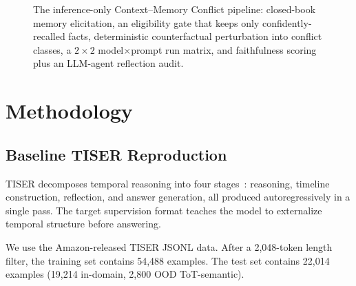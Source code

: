 \documentclass[conference]{IEEEtran}
\begin{document}
\begin{figure}[t]
\centering
{}
\caption{The inference-only Context--Memory Conflict pipeline: closed-book memory elicitation, an eligibility gate that keeps only confidently-recalled facts, deterministic counterfactual perturbation into conflict classes, a $2{\times}2$ model$\times$prompt run matrix, and faithfulness scoring plus an LLM-agent reflection audit.}
\label{fig:pipeline}
\end{figure}

\section{Methodology}
\label{sec:methodology}

\subsection{Baseline TISER Reproduction}

TISER decomposes temporal reasoning into four stages~\cite{bazaga2025tiser}: reasoning, timeline construction, reflection, and answer generation, all produced autoregressively in a single pass. The target supervision format teaches the model to externalize temporal structure before answering.

We use the Amazon-released TISER JSONL data. After a 2,048-token length filter, the training set contains 54,488 examples. The test set contains 22,014 examples (19,214 in-domain, 2,800 OOD ToT-semantic).
\end{document}

